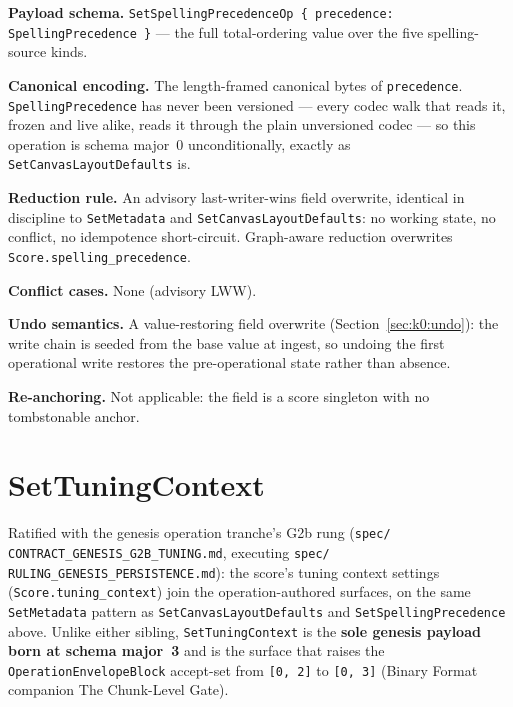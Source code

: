 \documentclass[11pt,letterpaper]{report}
\newcommand{\sectionsc}[1]{{\addfontfeatures{Letters=SmallCaps}#1}}
\begin{document}
\textbf{Payload schema.} \texttt{SetSpellingPrecedenceOp \{ precedence:
SpellingPrecedence \}} --- the full total-ordering value over the five
spelling-source kinds.

\textbf{Canonical encoding.} The length-framed canonical bytes of
\texttt{precedence}. \texttt{SpellingPrecedence} has never been versioned ---
every codec walk that reads it, frozen and live alike, reads it through the
plain unversioned codec --- so this operation is schema major~0
unconditionally, exactly as \texttt{SetCanvasLayoutDefaults} is.

\textbf{Reduction rule.} An advisory last-writer-wins field overwrite,
identical in discipline to \texttt{SetMetadata} and
\texttt{SetCanvasLayoutDefaults}: no working state, no conflict, no
idempotence short-circuit. Graph-aware reduction overwrites
\texttt{Score.spelling\_precedence}.

\textbf{Conflict cases.} None (advisory LWW).

\textbf{Undo semantics.} A value-restoring field overwrite
(Section~\ref{sec:k0:undo}): the write chain is seeded from the base value at
ingest, so undoing the first operational write restores the pre-operational
state rather than absence.

\textbf{Re-anchoring.} Not applicable: the field is a score singleton with no
tombstonable anchor.

\section{SetTuningContext}
\label{sec:k0:set-tuning-context}

Ratified with the genesis operation tranche's G2b rung (\texttt{spec/
CONTRACT\_GENESIS\_G2B\_TUNING.md}, executing \texttt{spec/
RULING\_GENESIS\_PERSISTENCE.md}): the score's tuning context settings
(\texttt{Score.tuning\_context}) join the operation-authored surfaces, on
the same \texttt{SetMetadata} pattern as \texttt{SetCanvasLayoutDefaults}
and \texttt{SetSpellingPrecedence} above. Unlike either sibling,
\texttt{SetTuningContext} is the \textbf{sole genesis payload born at
schema major~3} and is the surface that raises the
\texttt{OperationEnvelopeBlock} accept-set from \texttt{[0, 2]} to
\texttt{[0, 3]} (Binary Format companion \sectionsc{The Chunk-Level Gate}).
\end{document}

